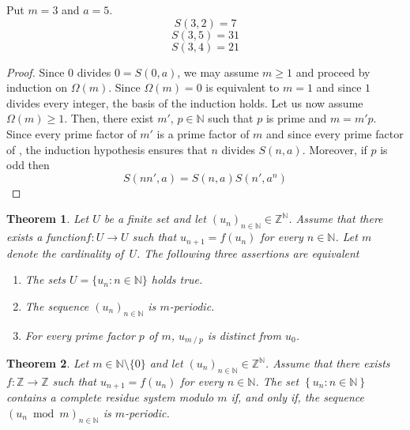 \documentclass[12pt]{article}
\newcommand{\bZ}{\mathbb{Z}}
\newcommand{\bN}{\mathbb{N}} %
\newcommand{\bNast}{\bN \setminus \{ 0 \}}
\newtheorem{theorem}{Theorem}
\theoremstyle{definition}
\begin{document}
Put $m = 3$ and $a = 5$.
$$
S(3, 2) = 7
$$
$$
S(3, 5) = 31
$$
$$
S(3, 4) = 21
$$




\begin{proof}
  Since $0$ divides $0 = S(0, a)$,  we may assume $m \ge 1$ and proceed by induction on $\Omega(m)$.
  Since  $\Omega(m) = 0$ is equivalent to $m = 1$ and since $1$ divides every integer,
  the basis of the induction holds.
  Let us now assume  $\Omega(m) \ge 1$.
  Then, there exist $m'$, $p \in \bN$  such that  $p$ is prime and $m = m' p$.
  Since every prime factor of $m'$ is a prime factor of $m$ and since every prime factor of , the induction hypothesis ensures that $n$ divides $S(n, a)$.
  Moreover, if $p$ is odd then 
  $$
  S(n n', a) = S(n, a) S(n', a^n)
  $$
\end{proof}




  
 

 \begin{theorem}
   Let $U$ be a finite set  and let $\left(u_n \right)_{n \in \bN} \in \bZ^\bN$.
   Assume that there exists a function$f\colon U \to U$
   such that  $u_{n + 1} = f(u_n)$ for every $n \in \bN$.
   Let $m$ denote the cardinality of~$U$.
   The following three assertions are equivalent
   \begin{enumerate}
     \item The sets  $U = \{ u_n : n \in \bN \}$ holds true.
     \item The sequence $\left(u_n \right)_{n \in \bN}$ is $m$-periodic.
      \item For every prime factor $p$ of $m$, $u_{m \mathbin{/} p}$ is distinct from $u_0$.
    \end{enumerate}
   \end{theorem}
 
 \begin{theorem}
   Let $m \in \bNast$ and let $\left(u_n \right)_{n \in \bN} \in \bZ^\bN$.
   Assume that there exists $f \colon \bZ \to \bZ$ such that  $u_{n + 1} = f( u_n)$ for every $n \in \bN$.
   The set $\left\{ u_n : n \in \bN \right\}$ contains a complete residue system modulo $m$
   if, and only if,
   the sequence $\left(u_n \bmod m \right)_{n \in \bN}$ is $m$-periodic.
 \end{theorem}
\end{document}

